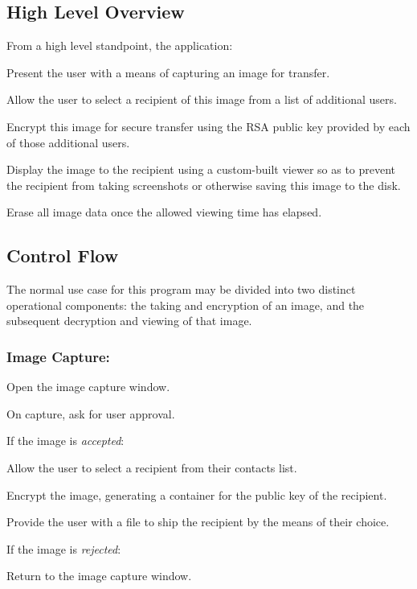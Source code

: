 \documentclass[11pt, a4paper,titlepage]{report}
\begin{document}
\subsection*{High Level Overview}
From a high level standpoint, the application:
\begin{itemize*}
	\item {Present the user with a means of capturing an image for transfer.}
	\item {Allow the user to select a recipient of this image from a list of additional users.}
	\item {Encrypt this image for secure transfer using the RSA public key provided by each of those additional users.}
	\item {Display the image to the recipient using a custom-built viewer so as to prevent the recipient from taking screenshots or otherwise saving this image to the disk.}
	\item {Erase all image data once the allowed viewing time has elapsed.}
\end{itemize*} 

\subsection*{Control Flow}
The normal use case for this program may be divided into two distinct operational components: the taking and encryption of an image, and the subsequent decryption and viewing of that image.

\subsubsection{Image Capture:}
\begin{itemize*}
	\item Open the image capture window.
	\item On capture, ask for user approval.
	\begin{itemize*}
		\item[] If the image is \emph{accepted}:
		\begin{itemize*}
			\item Allow the user to select a recipient from their contacts list.
			\item Encrypt the image, generating a container for the public key of the recipient.
                        \item Provide the user with a file to ship the recipient by the means of their choice.
		\end{itemize*}
		\item[] If the image is \emph{rejected}:
		\begin{itemize*}
			\item Return to the image capture window.
		\end{itemize*}
	\end{itemize*}
\end{itemize*}
\end{document}
